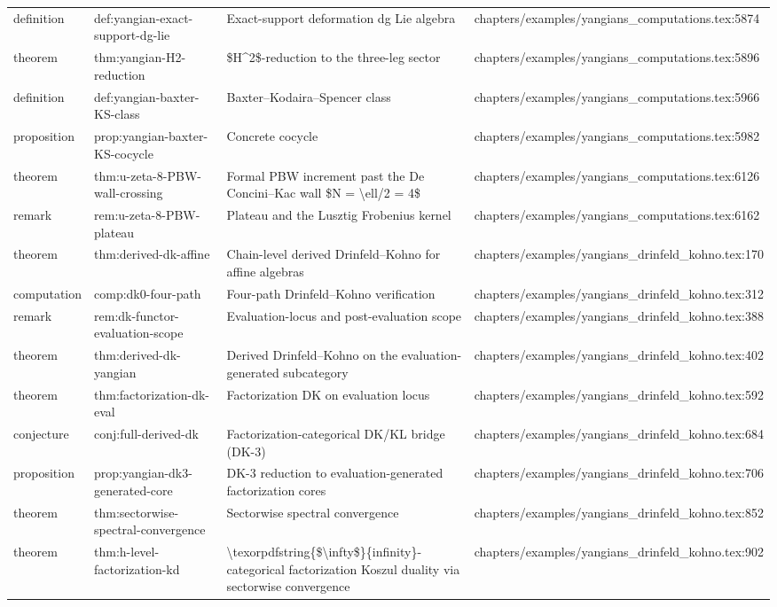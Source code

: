 \documentclass[11pt]{article}
\begin{document}
\begin{longtable}{L{0.10\textwidth}L{0.26\textwidth}L{0.42\textwidth}L{0.22\textwidth}}
definition & def:yangian-exact-support-dg-lie & Exact-support deformation dg Lie algebra & chapters/examples/yangians\_computations.tex:5874\\
theorem & thm:yangian-H2-reduction & \$H\textasciicircum{}2\$-reduction to the three-leg sector & chapters/examples/yangians\_computations.tex:5896\\
definition & def:yangian-baxter-KS-class & Baxter--Kodaira--Spencer class & chapters/examples/yangians\_computations.tex:5966\\
proposition & prop:yangian-baxter-KS-cocycle & Concrete cocycle & chapters/examples/yangians\_computations.tex:5982\\
theorem & thm:u-zeta-8-PBW-wall-crossing & Formal PBW increment past the De Concini--Kac wall \$N = \textbackslash{}ell/2 = 4\$ & chapters/examples/yangians\_computations.tex:6126\\
remark & rem:u-zeta-8-PBW-plateau & Plateau and the Lusztig Frobenius kernel & chapters/examples/yangians\_computations.tex:6162\\
theorem & thm:derived-dk-affine & Chain-level derived Drinfeld--Kohno for affine algebras & chapters/examples/yangians\_drinfeld\_kohno.tex:170\\
computation & comp:dk0-four-path & Four-path Drinfeld--Kohno verification & chapters/examples/yangians\_drinfeld\_kohno.tex:312\\
remark & rem:dk-functor-evaluation-scope & Evaluation-locus and post-evaluation scope & chapters/examples/yangians\_drinfeld\_kohno.tex:388\\
theorem & thm:derived-dk-yangian & Derived Drinfeld--Kohno on the evaluation-generated subcategory & chapters/examples/yangians\_drinfeld\_kohno.tex:402\\
theorem & thm:factorization-dk-eval & Factorization DK on evaluation locus & chapters/examples/yangians\_drinfeld\_kohno.tex:592\\
conjecture & conj:full-derived-dk & Factorization-categorical DK/KL bridge (DK-3) & chapters/examples/yangians\_drinfeld\_kohno.tex:684\\
proposition & prop:yangian-dk3-generated-core & DK-3 reduction to evaluation-generated factorization cores & chapters/examples/yangians\_drinfeld\_kohno.tex:706\\
theorem & thm:sectorwise-spectral-convergence & Sectorwise spectral convergence & chapters/examples/yangians\_drinfeld\_kohno.tex:852\\
theorem & thm:h-level-factorization-kd & \textbackslash{}texorpdfstring\{\$\textbackslash{}infty\$\}\{infinity\}-categorical factorization Koszul duality via sectorwise convergence & chapters/examples/yangians\_drinfeld\_kohno.tex:902\\

\end{longtable}
\end{document}
